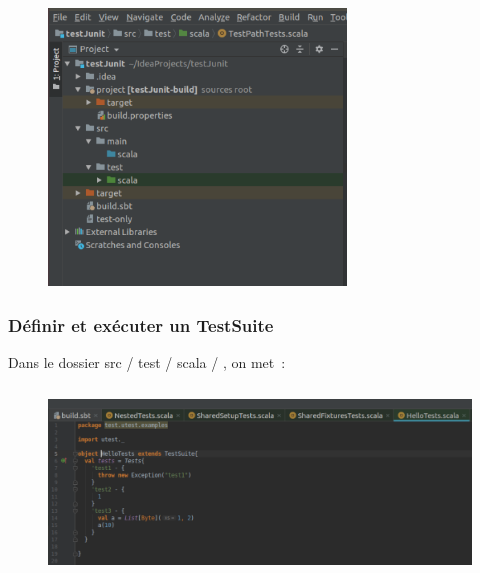 \documentclass[12pt]{article}
\begin{document}

\begin{figure}[H]
	\begin{Center}
		\includegraphics[width=3.12in,height=2.9in]{./media/image3.png}
	\end{Center}
\end{figure}



\par

\subsubsection{Définir et exécuter un TestSuite}

Dans le dossier src / test / scala / , on met :\par




\begin{figure}[H]
	\begin{Center}
		\includegraphics[width=5.06in,height=1.98in]{./media/image4.png}
	\end{Center}
\end{figure}
\end{document}
